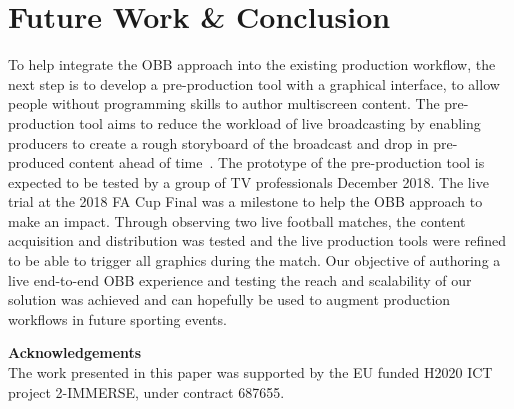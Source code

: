 \documentclass[sigchi-a, authorversion]{acmart}
\begin{document}
\section{Future Work \& Conclusion}

To help integrate the OBB approach into the existing
production workflow, the next step is to develop a pre-production tool with a
graphical interface, to allow people without programming skills to author
multiscreen content. The pre-production tool aims to reduce the workload of
live broadcasting by enabling producers to create a rough storyboard of the broadcast and
drop in pre-produced content ahead of time~\cite{Li:2018_TVX}. The
prototype of the pre-production tool is expected to be tested by a group of
TV professionals December 2018. The live trial at the 2018 FA Cup Final was a
milestone to help the OBB approach to make an impact. Through observing two live football matches, the
content acquisition and distribution was tested and the live production tools
were refined to be able to trigger all graphics during the match.
Our objective of authoring a live end-to-end OBB experience and testing the
reach and scalability of our solution was achieved and can hopefully be used to
augment production workflows in future sporting events.

\begin{sidebar}
    \vspace{2pc}
    \noindent\textbf{Acknowledgements}\\
    \noindent The work presented in this paper was supported by the EU funded
    H2020 ICT project 2-IMMERSE, under contract 687655.
\end{sidebar}



\end{document}
